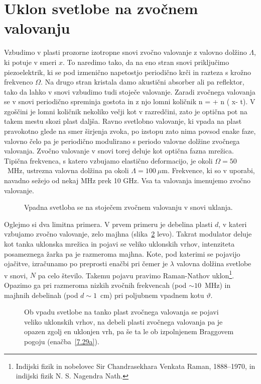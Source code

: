 \section{Uklon svetlobe na zvočnem valovanju}
Vzbudimo v plasti prozorne izotropne snovi zvočno valovanje z valovno dolžino $\Lambda$, 
ki potuje v smeri $x$. To naredimo tako, da na eno stran snovi priključimo piezoelektrik, 
ki se pod izmenično napetostjo periodično krči in razteza s krožno frekvenco $\Omega$.
Na drugo stran kristala damo akustični absorber ali pa reflektor, tako da lahko 
v snovi vzbudimo tudi stoječe valovanje. 
Zaradi zvočnega valovanja se v snovi periodično spreminja gostota in 
z njo lomni količnik
\beq
n =  + \Delta n \sin \left(\frac{2\pi}{\Lambda} x- \Omega t\right).
\eeq
V zgoščini je lomni količnik nekoliko večji kot v razredčini, zato je optična pot na takem mestu
skozi plast daljša. Ravno svetlobno valovanje, ki vpada na plast pravokotno glede
na smer širjenja zvoka, po izstopu zato nima povsod enake faze, 
valovno čelo pa je periodično modulirano s periodo 
valovne dolžine zvočnega valovanja. Zvočno valovanje v snovi torej deluje kot 
optična fazna mrežica. Tipična frekvenca, s katero vzbujamo elastično
deformacijo, je okoli $\Omega=50$~MHz, ustrezna valovna dolžina pa okoli $\Lambda = 100~\mu$m. 
Frekvence, ki so v uporabi, navadno sežejo od nekaj MHz prek 10 GHz. Vsa ta valovanja imenujemo
zvočno valovanje. 

\begin{figure}[h]
\centering
\def\svgwidth{60truemm} 

\caption{Vpadna svetloba se na stoječem zvočnem valovanju v snovi uklanja.}
\label{fig:ao}
\end{figure}

Oglejmo si dva limitna primera. V prvem primeru je debelina plasti $d$, 
v kateri vzbujamo zvočno valovanje, zelo majhna (slika~\ref{fig:ao_bragg} levo). 
Takrat modulator deluje kot tanka uklonska mrežica in pojavi se veliko 
uklonskih vrhov, intenziteta posameznega žarka pa je razmeroma majhna. 
Kote, pod katerimi se pojavijo ojačitve, izračunamo po preprosti enačbi
pri čemer je $\lambda$ valovna dolžina svetlobe v snovi, $N$ pa celo število. Takemu pojavu 
pravimo Raman-Nathov uklon\footnote{Indijski fizik in nobelovec Sir Chandrasekhara 
Venkata Raman, 1888--1970, 
in indijski fizik N. S. Nagendra Nath.}. 
Opazimo ga pri razmeroma nizkih zvočnih frekvencah 
(pod $\sim10$~MHz) in majhnih debelinah (pod $d\sim 1$~cm) pri poljubnem vpadnem 
kotu $\vartheta$.
\begin{figure}[h]
\centering
\def\svgwidth{50truemm} 
\qquad
\def\svgwidth{65truemm} 

\caption{Ob vpadu svetlobe na tanko plast zvočnega valovanja se pojavi veliko uklonskih vrhov, 
na debeli plasti zvočnega valovanja pa je opazen zgolj en uklonjen vrh, 
pa še ta le ob izpolnjenem Braggovem pogoju (enačba~\ref{7.29a}).}
\label{fig:ao_bragg}
\end{figure}

